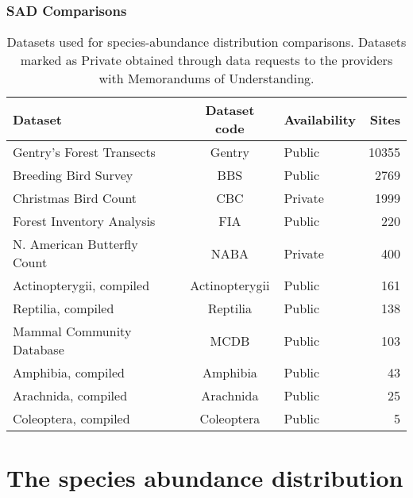\documentclass[14pt]{beamer}
\begin{document}
\begin{frame}[shrink=35]
\frametitle{SAD Comparisons}
\begin{center}
\begin{table}
\begin{tabular}{l|c|l|r}
 Dataset &Dataset code &Availability &Sites\\
\hline
 Gentry's Forest Transects &Gentry &Public &10355\\
 Breeding Bird Survey &BBS &Public &2769\\
 Christmas Bird Count &CBC &Private &1999\\
 Forest Inventory Analysis &FIA	 &Public &220\\
 N. American Butterfly Count &NABA &Private &400\\
 Actinopterygii, compiled &Actinopterygii &Public &161\\
 Reptilia, compiled &Reptilia &Public &138\\
 Mammal Community Database &MCDB &Public &103\\
 Amphibia, compiled &Amphibia &Public &43\\
 Arachnida, compiled &Arachnida &Public &25\\
 Coleoptera, compiled &Coleoptera &Public &5\\
\end{tabular}
\caption{Datasets used for species-abundance distribution comparisons. Datasets marked as Private obtained through data requests to the providers with Memorandums of Understanding.}
\end{table}
\end{center}
\end{frame}

\section{The species abundance distribution}
\end{document}
